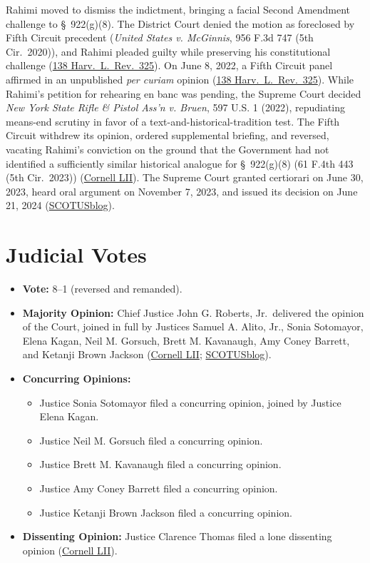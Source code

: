 \documentclass[12pt]{article}
\begin{document}
Rahimi moved to dismiss the indictment, bringing a facial Second Amendment challenge to \S\ 922(g)(8). The District Court denied the motion as foreclosed by Fifth Circuit precedent (\textit{United States v. McGinnis}, 956 F.3d 747 (5th Cir.\ 2020)), and Rahimi pleaded guilty while preserving his constitutional challenge (\href{https://harvardlawreview.org/print/vol-138/united-states-v-rahimi/}{138 Harv.\ L.\ Rev.\ 325}). On June 8, 2022, a Fifth Circuit panel affirmed in an unpublished \textit{per curiam} opinion (\href{https://harvardlawreview.org/print/vol-138/united-states-v-rahimi/}{138 Harv.\ L.\ Rev.\ 325}). While Rahimi's petition for rehearing en banc was pending, the Supreme Court decided \textit{New York State Rifle \& Pistol Ass'n v. Bruen}, 597 U.S. 1 (2022), repudiating means-end scrutiny in favor of a text-and-historical-tradition test. The Fifth Circuit withdrew its opinion, ordered supplemental briefing, and reversed, vacating Rahimi's conviction on the ground that the Government had not identified a sufficiently similar historical analogue for \S\ 922(g)(8) (61 F.4th 443 (5th Cir.\ 2023)) (\href{https://www.law.cornell.edu/supremecourt/text/22-915}{Cornell LII}). The Supreme Court granted certiorari on June 30, 2023, heard oral argument on November 7, 2023, and issued its decision on June 21, 2024 (\href{https://www.scotusblog.com/cases/united-states-v-rahimi/}{SCOTUSblog}).

\section{Judicial Votes}

\begin{itemize}
\item \textbf{Vote:} 8--1 (reversed and remanded).
\item \textbf{Majority Opinion:} Chief Justice John G. Roberts, Jr.\ delivered the opinion of the Court, joined in full by Justices Samuel A. Alito, Jr., Sonia Sotomayor, Elena Kagan, Neil M. Gorsuch, Brett M. Kavanaugh, Amy Coney Barrett, and Ketanji Brown Jackson (\href{https://www.law.cornell.edu/supremecourt/text/22-915}{Cornell LII}; \href{https://www.scotusblog.com/cases/united-states-v-rahimi/}{SCOTUSblog}).
\item \textbf{Concurring Opinions:}
  \begin{itemize}
  \item Justice Sonia Sotomayor filed a concurring opinion, joined by Justice Elena Kagan.
  \item Justice Neil M. Gorsuch filed a concurring opinion.
  \item Justice Brett M. Kavanaugh filed a concurring opinion.
  \item Justice Amy Coney Barrett filed a concurring opinion.
  \item Justice Ketanji Brown Jackson filed a concurring opinion.
  \end{itemize}
\item \textbf{Dissenting Opinion:} Justice Clarence Thomas filed a lone dissenting opinion (\href{https://www.law.cornell.edu/supremecourt/text/22-915}{Cornell LII}).
\end{itemize}
\end{document}
